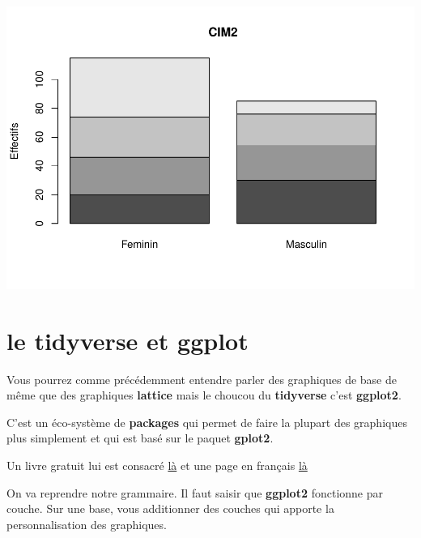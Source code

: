 \documentclass[
]{book}
\newenvironment{Shaded}{\begin{snugshade}}{\end{snugshade}}
\newcommand{\AttributeTok}[1]{\textcolor[rgb]{0.13,0.29,0.53}{#1}}
\newcommand{\FunctionTok}[1]{\textcolor[rgb]{0.13,0.29,0.53}{\textbf{#1}}}
\newcommand{\NormalTok}[1]{#1}
\newcommand{\OtherTok}[1]{\textcolor[rgb]{0.56,0.35,0.01}{#1}}
\newcommand{\SpecialCharTok}[1]{\textcolor[rgb]{0.81,0.36,0.00}{\textbf{#1}}}
\newcommand{\StringTok}[1]{\textcolor[rgb]{0.31,0.60,0.02}{#1}}
\begin{document}
\begin{Shaded}
\end{Shaded}

\includegraphics{_main_files/figure-latex/sexe2-1.pdf}

\hypertarget{le-tidyverse-et-ggplot}{%
\section{le tidyverse et ggplot}\label{le-tidyverse-et-ggplot}}

Vous pourrez comme précédemment entendre parler des graphiques de base de même
que des graphiques \textbf{lattice} mais le choucou du \textbf{tidyverse} c'est \textbf{ggplot2}.

C'est un éco-système de \textbf{packages} qui permet de faire la plupart des graphiques
plus simplement et qui est basé sur le paquet \textbf{gplot2}.

Un livre gratuit lui est consacré \href{https://ggplot2-book.org/}{là} et une page
en français \href{https://larmarange.github.io/analyse-R/graphiques-bivaries-ggplot2.html}{là}

On va reprendre notre grammaire. Il faut saisir que \textbf{ggplot2} fonctionne par
couche. Sur une base, vous additionner des couches qui apporte la personnalisation
des graphiques.
\end{document}
